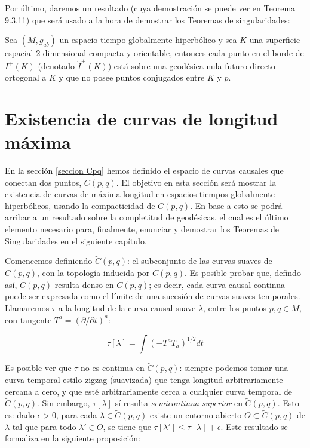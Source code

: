 Por último, daremos un resultado (cuya demostración se puede ver en \citep{1984ucp..book.....W} Teorema 9.3.11) que será usado a la hora de demostrar los Teoremas de singularidades:

\begin{theorem}\label{Teo 9.3.11 Wald}
Sea $(M,g_{ab})$ un espacio-tiempo globalmente hiperbólico y sea $K$ una superficie espacial 2-dimensional compacta y orientable, entonces cada punto en el borde de $I^+(K)$ (denotado $\dot{I}^+(K)$) está sobre una geodésica nula futuro directo ortogonal a $K$ y que no posee puntos conjugados entre $K$ y $p$.
\end{theorem}



    
\section{Existencia de curvas de longitud máxima}

    


En la sección \ref{seccion Cpq} hemos definido el espacio de curvas causales que conectan dos puntos, $C(p,q)$. El objetivo en esta sección será mostrar la existencia de curvas de máxima longitud en espacios-tiempos globalmente hiperbólicos, usando la compacticidad de $C(p,q)$. En base a esto se podrá arribar a un resultado sobre la completitud de geodésicas, el cual es el último elemento necesario para, finalmente, enunciar y demostrar los Teoremas de Singularidades en el siguiente capítulo. 

Comencemos definiendo $\widetilde{C}(p,q)$: el subconjunto de las curvas suaves de $C(p,q)$, con la topología inducida por $C(p,q)$. Es posible probar que, defindo así, $\widetilde{C}(p,q)$ resulta denso en $C(p,q)$; es decir, cada curva causal continua puede ser expresada como el límite de una sucesión de curvas suaves temporales. Llamaremos $\tau$ a la longitud de la curva causal suave $\lambda$, entre los puntos $p,q\in M$, con tangente $T^a=(\partial/\partial t)^a$: 

$$
\tau[\lambda]=\int (-T^aT_a)^{1/2}dt
$$


Es posible ver que $\tau$ no es continua en $\widetilde{C}(p,q)$: siempre podemos tomar una curva temporal estilo zigzag (suavizada) que tenga longitud arbitrariamente cercana a cero, y que esté arbitrariamente cerca a cualquier curva temporal de $\widetilde{C}(p,q)$. Sin embargo, $\tau[\lambda]$ sí resulta \textit{semicontinua superior} en $\widetilde{C}(p,q)$. Esto es: dado $\epsilon>0$, para cada $\lambda\in \widetilde{C}(p,q)$ existe un entorno abierto $O\subset \widetilde{C}(p,q)$ de $\lambda$ tal que para todo $\lambda' \in O$, se tiene que $\tau[\lambda']\leq \tau[\lambda]+\epsilon$. Este resultado se formaliza en la siguiente proposición:


